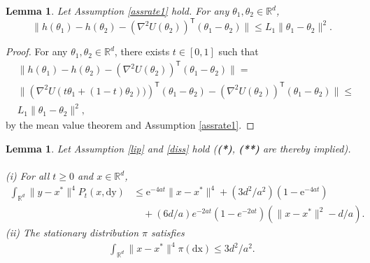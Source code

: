 \documentclass[a4paper]{article}
\newtheorem{lemma}[theorem]{Lemma}
\def\e{\text{e}}
\def\Rd{\mathbb{R}^d}
\begin{document}
\begin{lemma}\label{mvt}
	Let Assumption \ref{assrate1} hold. For any $\theta_1, \theta_2 \in \mathbb{R}^d$,
	\[
	\|h(\theta_1) - h(\theta_2) - \left(\nabla^2 U (\theta_2)\right)^{\mathsf{T}}(\theta_1- \theta_2)\| \leq L_1 \|\theta_1-\theta_2\|^2.
	\]
\end{lemma}
\begin{proof}
For any $\theta_1, \theta_2 \in \mathbb{R}^d$, there exists $t \in [0,1]$ such that
	\begin{align*}
	& \|h(\theta_1) - h(\theta_2) - \left(\nabla^2 U (\theta_2)\right)^{\mathsf{T}}(\theta_1- \theta_2)\| =
    \\
    & \| \left(\nabla^2 U (t\theta_1+(1-t)\theta_2))\right)^{\mathsf{T}}(\theta_1- \theta_2) - \left(\nabla^2 U (\theta_2)\right)^{\mathsf{T}}(\theta_1- \theta_2)\| \leq
    \\
	&  L_1 \|\theta_1-\theta_2\|^2,
\end{align*}
by the mean value theorem and Assumption \ref{assrate1}.
\end{proof}
\begin{lemma}\label{lemmaforrate1}
	Let Assumption \ref{lip} and \ref{diss} hold ({\bf (*)}, {\bf (**)} are thereby implied).
	\\
	\\
	(i) For all $t\geq 0$ and $x \in \Rd$,
	\begin{align*}
	\int_{\Rd}\|y-x^*\|^4 P_t(x,\mathrm{dy}) &\leq \e^{-4at}\|x-x^*\|^4+(3d^2/a^2)\left(1 -\e^{-4at}\right)\\
	& \hspace{1em} +(6d/a)e^{-2at}(1-e^{-2at})(\|x-x^*\|^2-d/a).
	\end{align*}
	(ii) The stationary distribution $\pi$ satisfies
	\begin{align*}
	\int_{\Rd}\|x-x^*\|^4\pi(\mathrm{dx}) \leq 3d^2/a^2.
	\end{align*}
\end{lemma}
\end{document}
